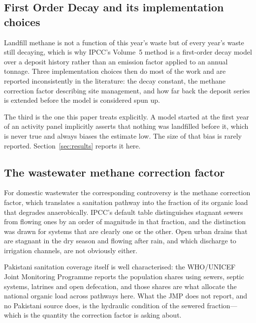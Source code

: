 \subsection{First Order Decay and its implementation choices}

Landfill methane is not a function of this year's waste but of every year's waste still
decaying, which is why IPCC's Volume~5 method is a first-order decay model over a deposit
history rather than an emission factor applied to an annual tonnage. Three implementation
choices then do most of the work and are reported inconsistently in the literature: the decay
constant, the methane correction factor describing site management, and how far back the
deposit series is extended before the model is considered spun up.

The third is the one this paper treats explicitly. A model started at the first year of an
activity panel implicitly asserts that nothing was landfilled before it, which is never true
and always biases the estimate low. The size of that bias is rarely reported.
Section~\ref{sec:results} reports it here.

\subsection{The wastewater methane correction factor}

For domestic wastewater the corresponding controversy is the methane correction factor, which
translates a sanitation pathway into the fraction of its organic load that degrades
anaerobically. IPCC's default table distinguishes stagnant sewers from flowing ones by an
order of magnitude in that fraction, and the distinction was drawn for systems that are
clearly one or the other. Open urban drains that are stagnant in the dry season and flowing
after rain, and which discharge to irrigation channels, are not obviously either.

Pakistani sanitation coverage itself is well characterised: the WHO/UNICEF Joint Monitoring
Programme \citep{jmp2023} reports the population shares using sewers, septic systems, latrines
and open defecation, and those shares are what allocate the national organic load across
pathways here.
What the JMP does not report, and no Pakistani source does, is the hydraulic condition of the
sewered fraction---which is the quantity the correction factor is asking about.
